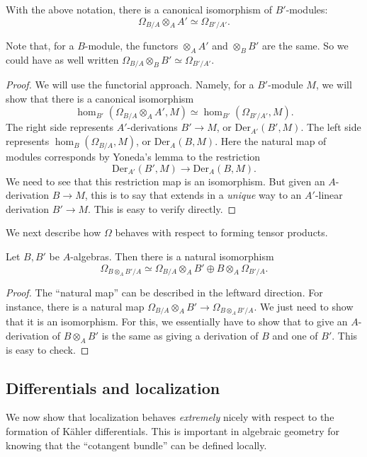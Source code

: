 \begin{proposition} \label{basechangediff} With the above notation, there is a canonical isomorphism
of $B'$-modules:
\[ \Omega_{B/A} \otimes_A A' \simeq \Omega_{B'/A'}.  \]
\end{proposition} 
Note that, for a $B$-module, the functors $\otimes_A A'$ and $\otimes_B B'$ are
the same. So we could have as well written $\Omega_{B/A} \otimes_B B' \simeq
\Omega_{B'/A'}$.
\begin{proof} 
We will use the functorial approach. Namely, for a $B'$-module $M$, we will
show that there is a canonical isomorphism
\[ \hom_{B'}( \Omega_{B/A} \otimes_A A', M) \simeq 
\hom_{B'}( \Omega_{B'/A'}, M) .
\]
The right side represents $A'$-derivations $B' \to M$, or $\mathrm{Der}_{A'}(B', M)$.
The left side represents $\hom_B(\Omega_{B/A}, M)$, or $\mathrm{Der}_A(B, M)$.
Here the natural map of modules corresponds by Yoneda's lemma to the restriction
\[ \mathrm{Der}_{A'}(B', M) \to \mathrm{Der}_A(B, M).  \]
We need to see that this restriction map is an isomorphism. But given an
$A$-derivation $B \to M$, this is to say that extends in a \emph{unique} way to
an $A'$-linear derivation $B' \to M$. This is easy to verify directly.
\end{proof} 

We next describe how $\Omega$ behaves with respect to forming tensor products.
\begin{proposition} 
Let $B, B'$ be $A$-algebras. Then there is a natural isomorphism
\[ \Omega_{B \otimes_A B'/A} \simeq \Omega_{B/A} \otimes_A B' \oplus B
\otimes_A \Omega_{B'/A} .  \]
\end{proposition}
\begin{proof} 
The ``natural map'' can be described in the leftward direction. For instance,
there is a natural map $\Omega_{B/A} \otimes_A B' \to \Omega_{B \otimes_A
B'/A}$. We just need to show that it is an isomorphism. 
For this, we essentially have to show that to give an $A$-derivation of $B
\otimes_A B'$ is the same as giving a derivation of $B$ and one of $B'$. This
is easy to check.
\end{proof} 

\subsection{Differentials and localization}
We now show that localization behaves \emph{extremely} nicely with respect to
the formation of K\"ahler differentials. This is important in algebraic
geometry for knowing that the ``cotangent bundle'' can be defined locally.

